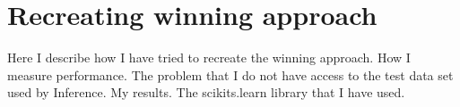 \chapter{Recreating winning approach}\label{sec:recreating}
Here I describe how I have tried to recreate the winning approach. How I measure performance. The problem that I do not have access to the test data set used by Inference. My results. The scikits.learn library that I have used.
